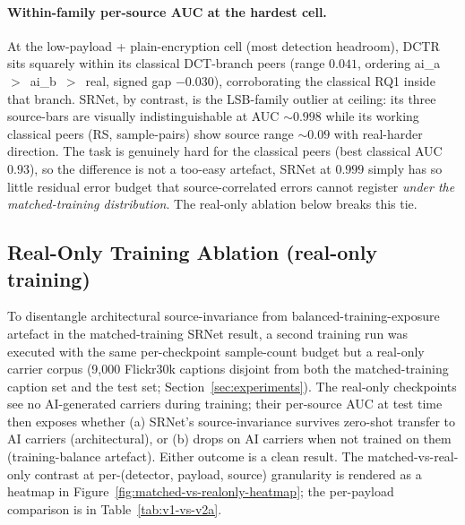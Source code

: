 \documentclass[10pt,twocolumn,a4paper]{article}
\begin{document}
\paragraph{Within-family per-source AUC at the hardest cell.} At the low-payload + plain-encryption cell (most detection headroom), DCTR sits squarely within its classical DCT-branch peers (range $0.041$, ordering ai\_a~$>$~ai\_b~$>$~real, signed gap $-0.030$), corroborating the classical RQ1 inside that branch. SRNet, by contrast, is the LSB-family outlier at ceiling: its three source-bars are visually indistinguishable at AUC $\sim\!0.998$ while its working classical peers (RS, sample-pairs) show source range $\sim\!0.09$ with real-harder direction. The task is genuinely hard for the classical peers (best classical AUC $0.93$), so the difference is not a too-easy artefact, SRNet at $0.999$ simply has so little residual error budget that source-correlated errors cannot register \emph{under the matched-training distribution}. The real-only ablation below breaks this tie.

\subsection{Real-Only Training Ablation (real-only training)}
\label{sec:v2a}

To disentangle architectural source-invariance from balanced-training-exposure artefact in the matched-training SRNet result, a second training run was executed with the same per-checkpoint sample-count budget but a real-only carrier corpus (9{,}000 Flickr30k captions disjoint from both the matched-training caption set and the test set; Section~\ref{sec:experiments}). The real-only checkpoints see no AI-generated carriers during training; their per-source AUC at test time then exposes whether (a) SRNet's source-invariance survives zero-shot transfer to AI carriers (architectural), or (b) drops on AI carriers when not trained on them (training-balance artefact). Either outcome is a clean result. The matched-vs-real-only contrast at per-(detector, payload, source) granularity is rendered as a heatmap in Figure~\ref{fig:matched-vs-realonly-heatmap}; the per-payload comparison is in Table~\ref{tab:v1-vs-v2a}.
\end{document}
